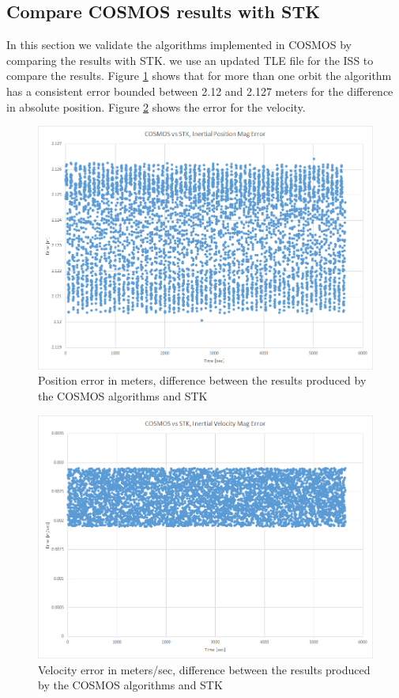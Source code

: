 \documentclass[12pt,letterpaper]{paper}
\begin{document}
\subsection{Compare COSMOS results with STK}

In this section we validate the algorithms implemented in COSMOS by comparing the results with STK. we use an updated TLE file for the ISS to compare the results. Figure \ref{fig:compare_cosmos_stk_tle2gcrf_pos_error} shows that for more than one orbit the algorithm has a consistent error bounded between 2.12 and 2.127 meters for the difference in absolute position. Figure \ref{fig:compare_cosmos_stk_tle2gcrf_vel_error} shows the error for the velocity. 
\begin{figure}
\centering
\includegraphics[width=0.9\linewidth]{figures/compare_cosmos_stk_tle2gcrf_pos_error}
\caption{Position error in meters, difference between the results produced by the COSMOS algorithms and STK}
\label{fig:compare_cosmos_stk_tle2gcrf_pos_error}
\end{figure}


\begin{figure}
\centering
\includegraphics[width=0.9\linewidth]{figures/compare_cosmos_stk_tle2gcrf_vel_error}
\caption{Velocity error in meters/sec, difference between the results produced by the COSMOS algorithms and STK}
\label{fig:compare_cosmos_stk_tle2gcrf_vel_error}
\end{figure}
\end{document}
